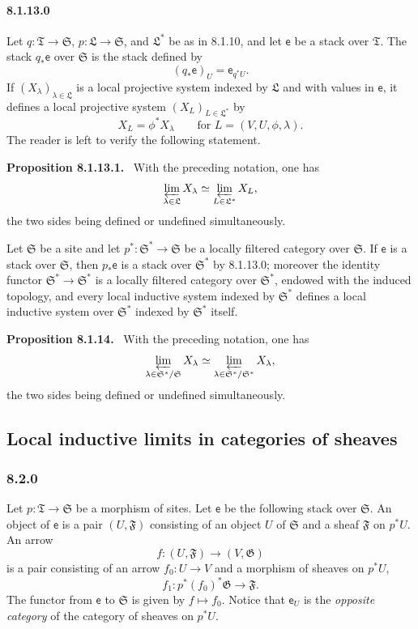 \documentclass[11pt]{article}
\newcommand{\Ss}{\mathfrak{S}}
\newcommand{\Tt}{\mathfrak{T}}
\newcommand{\Ll}{\mathfrak{L}}
\newcommand{\Ff}{\mathfrak{F}}
\newcommand{\Gg}{\mathfrak{G}}
\newenvironment{statement}[1]{\par\medskip\noindent\textbf{#1.}\ }{\par\medskip}
\begin{document}
\paragraph*{8.1.13.0}
Let $q:\Tt\to\Ss$, $p:\Ll\to\Ss$, and $\Ll^*$ be as in 8.1.10, and let $\mathsf e$ be a stack over $\Tt$. The stack $q_*\mathsf e$ over $\Ss$ is the stack defined by
\[
        (q_*\mathsf e)_U=\mathsf e_{q^*U}.
\]
If $(X_\lambda)_{\lambda\in\Ll}$ is a local projective system indexed by $\Ll$ and with values in $\mathsf e$, it defines a local projective system $(X_L)_{L\in\Ll^*}$ by
\[
        X_L=\phi^*X_\lambda
        \qquad\text{for }L=(V,U,\phi,\lambda).
\]
The reader is left to verify the following statement.

\begin{statement}{Proposition 8.1.13.1}
With the preceding notation, one has
\[
        \varprojlim_{\lambda\in\Ll}X_\lambda
        \simeq
        \varprojlim_{L\in\Ll^*}X_L,
\]
the two sides being defined or undefined simultaneously.
\end{statement}

Let $\Ss$ be a site and let $p^*:\Ss^*\to\Ss$ be a locally filtered category over $\Ss$. If $\mathsf e$ is a stack over $\Ss$, then $p_*\mathsf e$ is a stack over $\Ss^*$ by 8.1.13.0; moreover the identity functor $\Ss^*\to\Ss^*$ is a locally filtered category over $\Ss^*$, endowed with the induced topology, and every local inductive system indexed by $\Ss^*$ defines a local inductive system over $\Ss^*$ indexed by $\Ss^*$ itself.

\begin{statement}{Proposition 8.1.14}
With the preceding notation, one has
\[
        \varprojlim_{\lambda\in\Ss^*/\Ss}X_\lambda
        \simeq
        \varprojlim_{\lambda\in\Ss^*/\Ss^*}X_\lambda,
\]
the two sides being defined or undefined simultaneously.
\end{statement}

\subsection{Local inductive limits in categories of sheaves}

\subsubsection*{8.2.0}
Let $p:\Tt\to\Ss$ be a morphism of sites. Let $\mathsf e$ be the following stack over $\Ss$. An object of $\mathsf e$ is a pair $(U,\Ff)$ consisting of an object $U$ of $\Ss$ and a sheaf $\Ff$ on $p^*U$. An arrow
\[
        f:(U,\Ff)\to(V,\Gg)
\]
is a pair consisting of an arrow $f_0:U\to V$ and a morphism of sheaves on $p^*U$,
\[
        f_1:p^*(f_0)^*\Gg\to\Ff.
\]
The functor from $\mathsf e$ to $\Ss$ is given by $f\mapsto f_0$. Notice that $\mathsf e_U$ is the \emph{opposite category} of the category of sheaves on $p^*U$.
\end{document}
